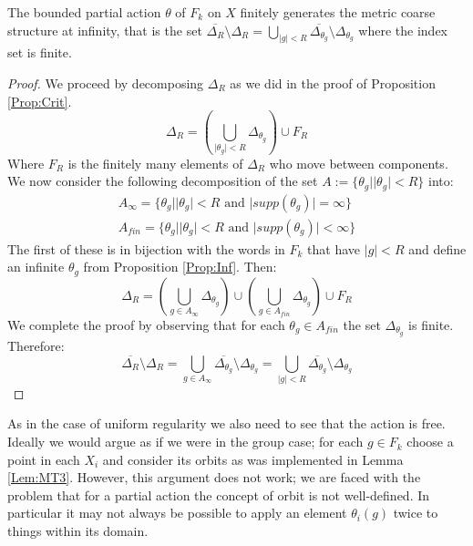 \begin{conjecture}
\begin{corollary}
The bounded partial action $\theta$ of $F_{k}$ on $X$ finitely generates the metric coarse structure at infinity, that is the set $\overline{\Delta_{R}}\setminus \Delta_{R} = \bigcup_{\vert g \vert < R}\overline{\Delta_{\theta_{g}}}\setminus \Delta_{\theta_{g}}$ where the index set is finite.
\end{corollary}
\begin{proof}
We proceed by decomposing $\Delta_{R}$ as we did in the proof of Proposition \ref{Prop:Crit}.
\begin{equation*}
\Delta_{R}=(\bigcup_{\vert \theta_{g} \vert < R}\Delta_{\theta_{g}})\cup F_{R}
\end{equation*}
Where $F_{R}$ is the finitely many elements of $\Delta_{R}$ who move between components. We now consider the following decomposition of the set $A:=\lbrace \theta_{g} | \vert \theta_{g}\vert < R\rbrace$ into:
\begin{eqnarray*}
A_{\infty}=\lbrace \theta_{g} | \vert \theta_{g} \vert < R \mbox{ and } \vert supp(\theta_{g})\vert = \infty \rbrace \\
A_{fin}=\lbrace \theta_{g} | \vert \theta_{g} \vert < R\mbox{ and } \vert supp(\theta_{g})\vert < \infty \rbrace
\end{eqnarray*}
The first of these is in bijection with the words in $F_{k}$ that have $\vert g \vert < R$ and define an infinite $\theta_{g}$ from Proposition \ref{Prop:Inf}. Then:
\begin{equation*}
\Delta_{R}=(\bigcup_{g \in A_{\infty}}\Delta_{\theta_{g}})\cup (\bigcup_{g \in A_{fin}}\Delta_{\theta_{g}}) \cup F_{R}
\end{equation*}
We complete the proof by observing that for each $\theta_{g} \in A_{fin}$ the set $\Delta_{\theta_{g}}$ is finite. Therefore:
\begin{equation*}
\overline{\Delta_{R}}\setminus \Delta_{R} = \bigcup_{g \in A_{\infty}}\overline{\Delta_{\theta_{g}}}\setminus \Delta_{\theta_{g}}= \bigcup_{\vert g \vert < R}\overline{\Delta_{\theta_{g}}}\setminus \Delta_{\theta_{g}}
\end{equation*}\end{proof}

As in the case of uniform regularity we also need to see that the action is free. Ideally we would argue as if we were in the group case; for each $g \in F_{k}$ choose a point in each $X_{i}$ and consider its orbits as was implemented in Lemma \ref{Lem:MT3}. However, this argument does not work; we are faced with the problem that for a partial action the concept of orbit is not well-defined. In particular it may not always be possible to apply an element $\theta_{i}(g)$ twice to things within its domain. 


\end{conjecture}
